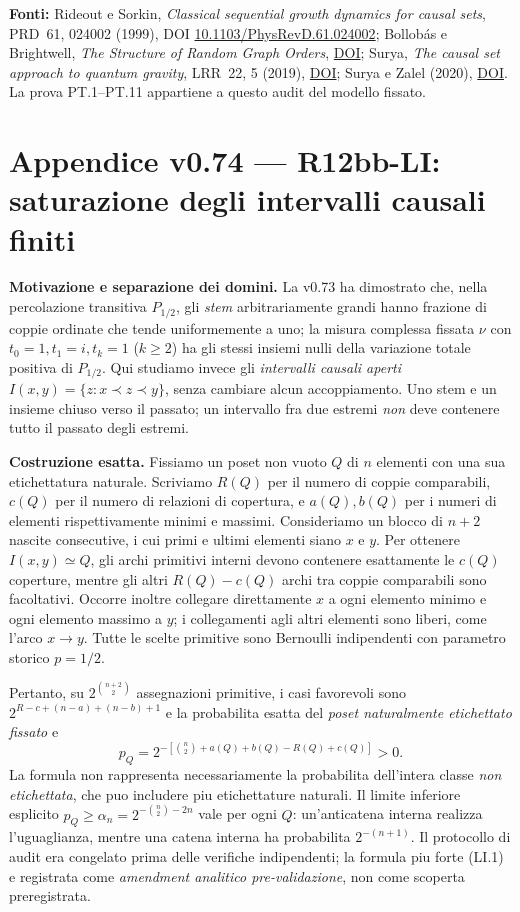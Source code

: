 \documentclass[11pt,a4paper]{article}
\begin{document}
\textbf{Fonti:} Rideout e Sorkin, \emph{Classical sequential growth dynamics for causal sets}, PRD~61, 024002 (1999), DOI \href{https://doi.org/10.1103/PhysRevD.61.024002}{10.1103/PhysRevD.61.024002}; Bollob\'as e Brightwell, \emph{The Structure of Random Graph Orders}, \href{https://doi.org/10.1137/S0895480194281215}{DOI}; Surya, \emph{The causal set approach to quantum gravity}, LRR~22, 5 (2019), \href{https://doi.org/10.1007/s41114-019-0023-1}{DOI}; Surya e Zalel (2020), \href{https://doi.org/10.1088/1361-6382/ab987f}{DOI}. La prova PT.1--PT.11 appartiene a questo audit del modello fissato.

\clearpage
\section*{Appendice v0.74 --- R12bb-LI: saturazione degli intervalli causali finiti}
\textbf{Motivazione e separazione dei domini.} La v0.73 ha dimostrato che, nella percolazione transitiva $P_{1/2}$, gli \emph{stem} arbitrariamente grandi hanno frazione di coppie ordinate che tende uniformemente a uno; la misura complessa fissata $\nu$ con $t_0=1,t_1=i,t_k=1$ ($k\ge2$) ha gli stessi insiemi nulli della variazione totale positiva di $P_{1/2}$. Qui studiamo invece gli \emph{intervalli causali aperti} $I(x,y)=\{z:x\prec z\prec y\}$, senza cambiare alcun accoppiamento. Uno stem e un insieme chiuso verso il passato; un intervallo fra due estremi \emph{non} deve contenere tutto il passato degli estremi.

\textbf{Costruzione esatta.} Fissiamo un poset non vuoto $Q$ di $n$ elementi con una sua etichettatura naturale. Scriviamo $R(Q)$ per il numero di coppie comparabili, $c(Q)$ per il numero di relazioni di copertura, e $a(Q),b(Q)$ per i numeri di elementi rispettivamente minimi e massimi. Consideriamo un blocco di $n+2$ nascite consecutive, i cui primi e ultimi elementi siano $x$ e $y$. Per ottenere $I(x,y)\simeq Q$, gli archi primitivi interni devono contenere esattamente le $c(Q)$ coperture, mentre gli altri $R(Q)-c(Q)$ archi tra coppie comparabili sono facoltativi. Occorre inoltre collegare direttamente $x$ a ogni elemento minimo e ogni elemento massimo a $y$; i collegamenti agli altri elementi sono liberi, come l'arco $x\to y$. Tutte le scelte primitive sono Bernoulli indipendenti con parametro storico $p=1/2$.

Pertanto, su $2^{\binom{n+2}{2}}$ assegnazioni primitive, i casi favorevoli sono $2^{R-c+(n-a)+(n-b)+1}$ e la probabilita esatta del \emph{poset naturalmente etichettato fissato} e
\begin{equation}
\boxed{\displaystyle p_Q=2^{-\left[\binom n2+a(Q)+b(Q)-R(Q)+c(Q)\right]}>0.}
\tag{LI.1}
\end{equation}
La formula non rappresenta necessariamente la probabilita dell'intera classe \emph{non etichettata}, che puo includere piu etichettature naturali. Il limite inferiore esplicito $p_Q\ge\alpha_n=2^{-\binom n2-2n}$ vale per ogni $Q$: un'anticatena interna realizza l'uguaglianza, mentre una catena interna ha probabilita $2^{-(n+1)}$. Il protocollo di audit era congelato prima delle verifiche indipendenti; la formula piu forte (LI.1) e registrata come \emph{amendment analitico pre-validazione}, non come scoperta preregistrata.
\end{document}
